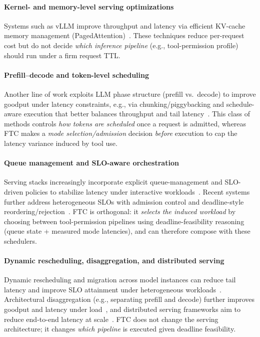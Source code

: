 \documentclass[preprint,12pt]{elsarticle}
\begin{document}
\paragraph{Kernel- and memory-level serving optimizations}
Systems such as vLLM improve throughput and latency via efficient KV-cache memory management (PagedAttention)~\cite{kwon2023pagedattention}. These techniques reduce per-request cost but do not decide \emph{which inference pipeline} (e.g., tool-permission profile) should run under a firm request TTL.

\paragraph{Prefill--decode and token-level scheduling}
Another line of work exploits LLM phase structure (prefill vs.\ decode) to improve goodput under latency constraints, e.g., via chunking/piggybacking and schedule-aware execution that better balances throughput and tail latency~\cite{agrawal2024sarathiserve}. This class of methods controls \emph{how tokens are scheduled} once a request is admitted, whereas FTC makes a \emph{mode selection/admission} decision \emph{before} execution to cap the latency variance induced by tool use.

\paragraph{Queue management and SLO-aware orchestration}
Serving stacks increasingly incorporate explicit queue-management and SLO-driven policies to stabilize latency under interactive workloads~\cite{patke2024qlm,hong2025sola,chen2025slosserve, jitserve2025}. Recent systems further address heterogeneous SLOs with admission control and deadline-style reordering/rejection~\cite{tang2025scorpio,zhong2024distserve}. FTC is orthogonal: it \emph{selects the induced workload} by choosing between tool-permission pipelines using deadline-feasibility reasoning (queue state + measured mode latencies), and can therefore compose with these schedulers.

\paragraph{Dynamic rescheduling, disaggregation, and distributed serving}
Dynamic rescheduling and migration across model instances can reduce tail latency and improve SLO attainment under heterogeneous workloads~\cite{sun2024llumnix}. Architectural disaggregation (e.g., separating prefill and decode) further improves goodput and latency under load~\cite{zhong2024distserve}, and distributed serving frameworks aim to reduce end-to-end latency at scale~\cite{wu2023fastserve}. FTC does not change the serving architecture; it changes \emph{which pipeline} is executed given deadline feasibility.
\end{document}
